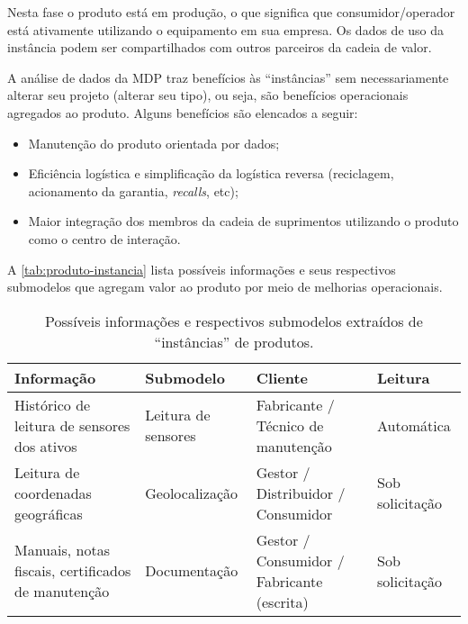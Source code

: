 	Nesta fase o produto está em produção, o que significa que consumidor/operador está ativamente utilizando o equipamento em sua empresa. Os dados de uso da instância podem ser compartilhados com outros parceiros da cadeia de valor.
	
	A análise de dados da MDP traz benefícios às ``instâncias'' sem necessariamente alterar seu projeto (alterar seu tipo), ou seja, são benefícios operacionais agregados ao produto. Alguns benefícios são elencados a seguir:	

	\begin{itemize}
		\item Manutenção do produto orientada por dados;
		\item Eficiência logística e simplificação da logística reversa (reciclagem, acionamento da garantia, \textit{recalls}, etc);
		\item Maior integração dos membros da cadeia de suprimentos utilizando o produto como o centro de interação.
	\end{itemize}

	A \autoref{tab:produto-instancia} lista possíveis informações e seus respectivos submodelos que agregam valor ao produto por meio de melhorias operacionais.

	\begin{table}[htb]
		\centering
		\caption{Possíveis informações e respectivos submodelos extraídos de ``instâncias'' de produtos.}
		\label{tab:produto-instancia}
		\begin{tabular}{p{4cm}p{3cm}p{3cm}p{4cm}}
			
			\hline
			\textbf{Informação}
			& \textbf{Submodelo}
			& \textbf{Cliente}
			& \textbf{Leitura}	
			\\
			
			\hline
			Histórico de leitura de sensores dos ativos
			& Leitura de sensores
			& Fabricante / Técnico de manutenção
			& Automática
			\\
			
			\hline
			Leitura de coordenadas geográficas
			& Geolocalização
			& Gestor / Distribuidor / Consumidor
			& Sob solicitação
			\\
			
			\hline
			Manuais, notas fiscais, certificados de manutenção
			& Documentação
			& Gestor / Consumidor / Fabricante (escrita)
			& Sob solicitação
			\\

			\hline
		\end{tabular}
	\end{table}

